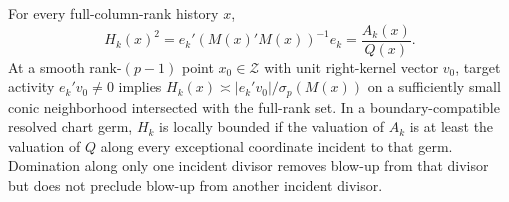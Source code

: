 For every full-column-rank history \(x\), \[H_k(x)^2=e_k'(M(x)'M(x))^{-1}e_k=\frac{A_k(x)}{Q(x)}.\] At a smooth rank-\((p-1)\) point \(x_0\in\mathcal Z\) with unit right-kernel vector \(v_0\), target activity \(e_k'v_0\ne0\) implies \(H_k(x)\asymp |e_k'v_0|/\sigma_p(M(x))\) on a sufficiently small conic neighborhood intersected with the full-rank set. In a boundary-compatible resolved chart germ, \(H_k\) is locally bounded if the valuation of \(A_k\) is at least the valuation of \(Q\) along every exceptional coordinate incident to that germ. Domination along only one incident divisor removes blow-up from that divisor but does not preclude blow-up from another incident divisor.